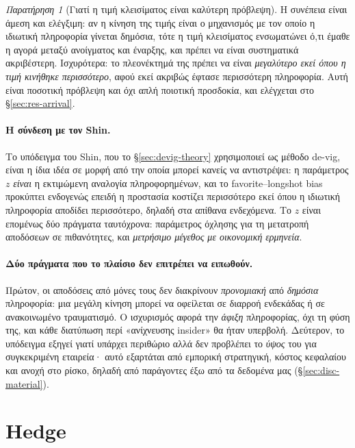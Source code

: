 \documentclass[12pt,a4paper,oneside]{report}
\renewcommand{\_}{\oldunderscore\allowbreak}
\theoremstyle{definition}
\theoremstyle{plain}
\theoremstyle{remark}
\newtheorem{remark}[theorem]{Παρατήρηση}
\begin{document}
\begin{remark}[Γιατί η τιμή κλεισίματος είναι καλύτερη πρόβλεψη]
\label{rem:closing}
Η συνέπεια είναι άμεση και ελέγξιμη: αν η κίνηση της τιμής είναι ο μηχανισμός με τον οποίο η
ιδιωτική πληροφορία γίνεται δημόσια, τότε η τιμή κλεισίματος ενσωματώνει ό,τι έμαθε η αγορά
μεταξύ ανοίγματος και έναρξης, και πρέπει να είναι συστηματικά ακριβέστερη. Ισχυρότερα: το
πλεονέκτημά της πρέπει να είναι \emph{μεγαλύτερο εκεί όπου η τιμή κινήθηκε περισσότερο},
αφού εκεί ακριβώς έφτασε περισσότερη πληροφορία. Αυτή είναι ποσοτική πρόβλεψη και όχι απλή
ποιοτική προσδοκία, και ελέγχεται στο \S\ref{sec:res-arrival}.
\end{remark}

\paragraph{Η σύνδεση με τον Shin.} Το υπόδειγμα του Shin, που το \S\ref{sec:devig-theory}
χρησιμοποιεί ως μέθοδο de-vig, είναι η ίδια ιδέα σε μορφή από την οποία μπορεί κανείς να
αντιστρέψει: η παράμετρος $z$ \emph{είναι} η εκτιμώμενη αναλογία πληροφορημένων, και το
favorite--longshot bias προκύπτει ενδογενώς επειδή η προστασία κοστίζει περισσότερο εκεί όπου
η ιδιωτική πληροφορία αποδίδει περισσότερο, δηλαδή στα απίθανα ενδεχόμενα. Το $z$ είναι
επομένως δύο πράγματα ταυτόχρονα: παράμετρος όχλησης για τη μετατροπή αποδόσεων σε
πιθανότητες, και \emph{μετρήσιμο μέγεθος με οικονομική ερμηνεία}.

\paragraph{Δύο πράγματα που το πλαίσιο δεν επιτρέπει να ειπωθούν.} Πρώτον, οι αποδόσεις από
μόνες τους δεν διακρίνουν \emph{προνομιακή} από \emph{δημόσια} πληροφορία: μια μεγάλη κίνηση
μπορεί να οφείλεται σε διαρροή ενδεκάδας ή σε ανακοινωμένο τραυματισμό. Ο ισχυρισμός αφορά
την \emph{άφιξη} πληροφορίας, όχι τη φύση της, και κάθε διατύπωση περί «ανίχνευσης insider»
θα ήταν υπερβολή. Δεύτερον, το υπόδειγμα εξηγεί γιατί υπάρχει περιθώριο αλλά δεν προβλέπει το
\emph{ύψος} του για συγκεκριμένη εταιρεία· αυτό εξαρτάται από εμπορική στρατηγική, κόστος
κεφαλαίου και ανοχή στο ρίσκο, δηλαδή από παράγοντες έξω από τα δεδομένα μας
(\S\ref{sec:disc-material}).

\section{Hedge}
\end{document}
